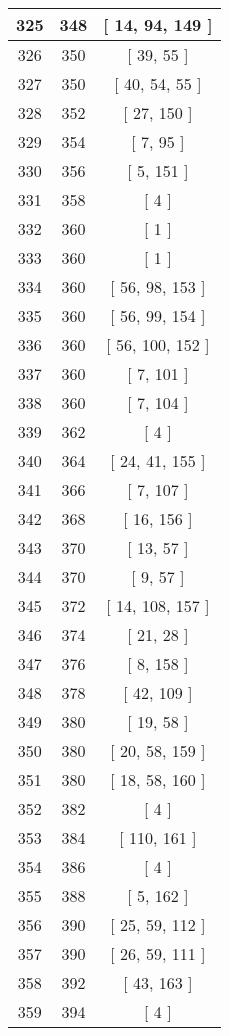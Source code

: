 \begin{center}
\begin{longtable}[H]{|| c c c ||}
\hline
325 & 348 & [ 14, 94, 149 ] \\ 
\hline
326 & 350 & [ 39, 55 ] \\ 
\hline
327 & 350 & [ 40, 54, 55 ] \\ 
\hline
328 & 352 & [ 27, 150 ] \\ 
\hline
329 & 354 & [ 7, 95 ] \\ 
\hline
330 & 356 & [ 5, 151 ] \\ 
\hline
331 & 358 & [ 4 ] \\ 
\hline
332 & 360 & [ 1 ] \\ 
\hline
333 & 360 & [ 1 ] \\ 
\hline
334 & 360 & [ 56, 98, 153 ] \\ 
\hline
335 & 360 & [ 56, 99, 154 ] \\ 
\hline
336 & 360 & [ 56, 100, 152 ] \\ 
\hline
337 & 360 & [ 7, 101 ] \\ 
\hline
338 & 360 & [ 7, 104 ] \\ 
\hline
339 & 362 & [ 4 ] \\ 
\hline
340 & 364 & [ 24, 41, 155 ] \\ 
\hline
341 & 366 & [ 7, 107 ] \\ 
\hline
342 & 368 & [ 16, 156 ] \\ 
\hline
343 & 370 & [ 13, 57 ] \\ 
\hline
344 & 370 & [ 9, 57 ] \\ 
\hline
345 & 372 & [ 14, 108, 157 ] \\ 
\hline
346 & 374 & [ 21, 28 ] \\ 
\hline
347 & 376 & [ 8, 158 ] \\ 
\hline
348 & 378 & [ 42, 109 ] \\ 
\hline
349 & 380 & [ 19, 58 ] \\ 
\hline
350 & 380 & [ 20, 58, 159 ] \\ 
\hline
351 & 380 & [ 18, 58, 160 ] \\ 
\hline
352 & 382 & [ 4 ] \\ 
\hline
353 & 384 & [ 110, 161 ] \\ 
\hline
354 & 386 & [ 4 ] \\ 
\hline
355 & 388 & [ 5, 162 ] \\ 
\hline
356 & 390 & [ 25, 59, 112 ] \\ 
\hline
357 & 390 & [ 26, 59, 111 ] \\ 
\hline
358 & 392 & [ 43, 163 ] \\ 
\hline
359 & 394 & [ 4 ] \\ 

\end{longtable}
\end{center}
